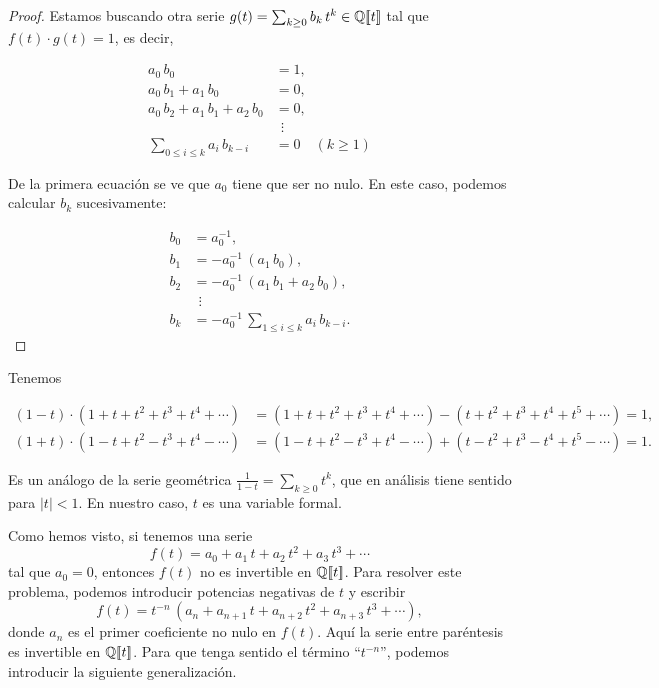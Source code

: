 \documentclass{article}
\begin{document}
\begin{proof}
Estamos buscando otra serie $g (t) = \sum_{k \ge 0} b_k\,t^k \in \mathbb{Q} [\![t]\!]$ tal que $f (t) \cdot g (t) = 1$, es decir,

\begin{align*}
a_0\,b_0 & = 1,\\
a_0\,b_1 + a_1\,b_0 & = 0,\\
a_0\,b_2 + a_1\,b_1 + a_2\,b_0 & = 0,\\
 & ~~\vdots \\
\sum_{0 \le i \le k} a_i\,b_{k-i} & = 0 \quad (k \ge 1)
\end{align*}

\pagebreak

De la primera ecuación se ve que $a_0$ tiene que ser no nulo. En este caso, podemos calcular $b_k$ sucesivamente:

\begin{align*}
b_0 & = a_0^{-1},\\
b_1 & = -a_0^{-1}\,(a_1\,b_0),\\
b_2 & = -a_0^{-1}\,(a_1\,b_1 + a_2\,b_0),\\
 & ~~\vdots \\
b_k & = -a_0^{-1}\,\sum_{1 \le i \le k} a_i\,b_{k-i}.
\end{align*}
\end{proof}

\begin{ejemplo*}
\label{serie-geometrica-formal}
Tenemos

\begin{align*}
(1-t)\cdot (1 + t + t^2 + t^3 + t^4 + \cdots) & = (1 + t + t^2 + t^3 + t^4 + \cdots) - (t + t^2 + t^3 + t^4 + t^5 + \cdots) = 1,\\
(1+t)\cdot (1 - t + t^2 - t^3 + t^4 - \cdots) & = (1 - t + t^2 - t^3 + t^4 - \cdots) + (t - t^2 + t^3 - t^4 + t^5 - \cdots) = 1.
\end{align*}

Es un análogo de la serie geométrica $\frac{1}{1-t} = \sum_{k \ge 0} t^k$, que en análisis tiene sentido para $|t| < 1$. En nuestro caso, $t$ es una variable formal.
\end{ejemplo*}

Como hemos visto, si tenemos una serie
$$f (t) = a_0 + a_1\,t + a_2\,t^2 + a_3\,t^3 + \cdots$$
tal que $a_0 = 0$, entonces $f (t)$ no es invertible en $\mathbb{Q} [\![t]\!]$. Para resolver este problema, podemos introducir potencias negativas de $t$ y escribir
$$f (t) = t^{-n} \, (a_n + a_{n+1}\,t + a_{n+2}\,t^2 + a_{n+3}\,t^3 + \cdots),$$
donde $a_n$ es el primer coeficiente no nulo en $f (t)$. Aquí la serie entre paréntesis es invertible en $\mathbb{Q} [\![t]\!]$. Para que tenga sentido el término ``$t^{-n}$'', podemos introducir la siguiente generalización.
\end{document}
